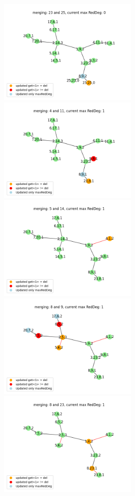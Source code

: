 \documentclass[10pt]{article}
\begin{document}
\includegraphics[width=0.5\textwidth]{images/merge10.png}
\includegraphics[width=0.5\textwidth]{images/merge11.png}
\includegraphics[width=0.5\textwidth]{images/merge12.png}
\includegraphics[width=0.5\textwidth]{images/merge13.png}
\includegraphics[width=0.5\textwidth]{images/merge14.png}
\end{document}
